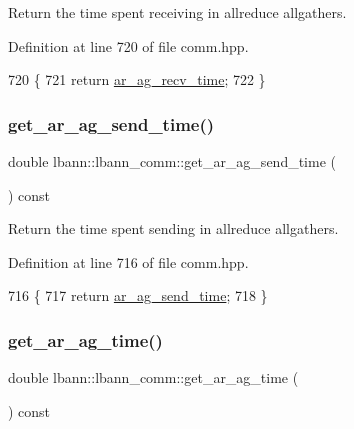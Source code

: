 Return the time spent receiving in allreduce allgathers. 

Definition at line 720 of file comm.\+hpp.


\begin{DoxyCode}
720                                             \{
721     \textcolor{keywordflow}{return} \hyperlink{classlbann_1_1lbann__comm_a1896c3ecd1d5b084497c6ed47c1c9bae}{ar\_ag\_recv\_time};
722   \}
\end{DoxyCode}
\mbox{\label{classlbann_1_1lbann__comm_a4482ccdfe56837dd4152c3a33f523a1c}} 
\subsubsection{\texorpdfstring{get\+\_\+ar\+\_\+ag\+\_\+send\+\_\+time()}{get\_ar\_ag\_send\_time()}}
{\footnotesize\ttfamily double lbann\+::lbann\+\_\+comm\+::get\+\_\+ar\+\_\+ag\+\_\+send\+\_\+time (\begin{DoxyParamCaption}{ }\end{DoxyParamCaption}) const\hspace{0.3cm}{\ttfamily [inline]}}

Return the time spent sending in allreduce allgathers. 

Definition at line 716 of file comm.\+hpp.


\begin{DoxyCode}
716                                             \{
717     \textcolor{keywordflow}{return} \hyperlink{classlbann_1_1lbann__comm_a64cb0b86e9368c1d83370ba6cb0083ba}{ar\_ag\_send\_time};
718   \}
\end{DoxyCode}
\mbox{\label{classlbann_1_1lbann__comm_aca331207a61bf11d8979c2c06e20b6be}} 
\subsubsection{\texorpdfstring{get\+\_\+ar\+\_\+ag\+\_\+time()}{get\_ar\_ag\_time()}}
{\footnotesize\ttfamily double lbann\+::lbann\+\_\+comm\+::get\+\_\+ar\+\_\+ag\+\_\+time (\begin{DoxyParamCaption}{ }\end{DoxyParamCaption}) const\hspace{0.3cm}{\ttfamily [inline]}}

